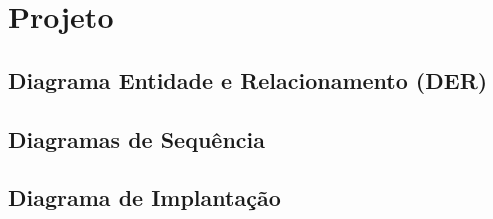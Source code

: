 \chapter{Projeto}

\section{Diagrama Entidade e Relacionamento (DER)}

\section{Diagramas de Sequência}

\section{Diagrama de Implantação}